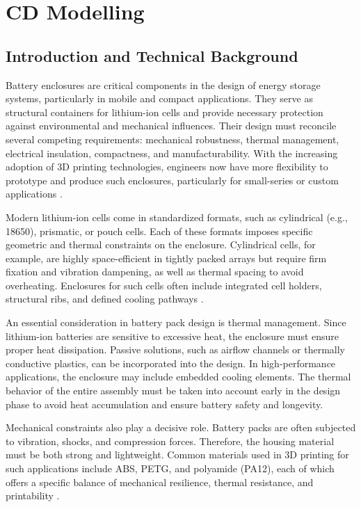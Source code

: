 \chapter{CD Modelling}
\section{Introduction and Technical Background}
Battery enclosures are critical components in the design of energy storage systems, particularly in mobile and compact applications. They serve as structural containers for lithium-ion cells and provide necessary protection against environmental and mechanical influences. Their design must reconcile several competing requirements: mechanical robustness, thermal management, electrical insulation, compactness, and manufacturability. With the increasing adoption of 3D printing technologies, engineers now have more flexibility to prototype and produce such enclosures, particularly for small-series or custom applications \cite{gebhardt2016}.

Modern lithium-ion cells come in standardized formats, such as cylindrical (e.g., 18650), prismatic, or pouch cells. Each of these formats imposes specific geometric and thermal constraints on the enclosure. Cylindrical cells, for example, are highly space-efficient in tightly packed arrays but require firm fixation and vibration dampening, as well as thermal spacing to avoid overheating. Enclosures for such cells often include integrated cell holders, structural ribs, and defined cooling pathways \cite{pistoia2018}. 

An essential consideration in battery pack design is thermal management. Since lithium-ion batteries are sensitive to excessive heat, the enclosure must ensure proper heat dissipation. Passive solutions, such as airflow channels or thermally conductive plastics, can be incorporated into the design. In high-performance applications, the enclosure may include embedded cooling elements. The thermal behavior of the entire assembly must be taken into account early in the design phase to avoid heat accumulation and ensure battery safety and longevity.

Mechanical constraints also play a decisive role. Battery packs are often subjected to vibration, shocks, and compression forces. Therefore, the housing material must be both strong and lightweight. Common materials used in 3D printing for such applications include ABS, PETG, and polyamide (PA12), each of which offers a specific balance of mechanical resilience, thermal resistance, and printability \cite{gebhardt2016}.

